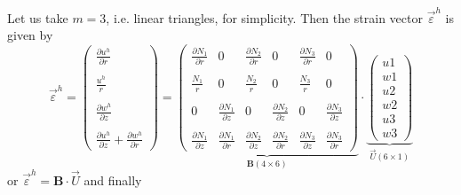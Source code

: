 \noindent Let us take $m=3$, i.e. linear triangles, for simplicity. Then 
the strain vector $\vec{\varepsilon}^h$ is given by
\[
\vec\varepsilon^h=
\left(
\begin{array}{c}
\frac{\partial u^h}{\partial r} \\ \\
\frac{u^h}{r} \\ \\
\frac{\partial w^h}{\partial z} \\ \\
\frac{\partial u^h}{\partial z} + \frac{\partial w^h}{\partial r} 
\end{array}
\right)
=
\underbrace{
\left(
\begin{array}{ccccccccc}
\frac{\partial N_1}{\partial r} &  0 &  
\frac{\partial N_2}{\partial r} &  0 &
\frac{\partial N_3}{\partial r} &  0 \\  \\
\frac{N_1}{r}  & 0 &  
\frac{N_2}{r}  & 0 &
\frac{N_3}{r}  & 0 \\  \\
 0 & \frac{\partial N_1}{\partial z}  &
 0 & \frac{\partial N_2}{\partial z}  &
 0 & \frac{\partial N_3}{\partial z}  \\ \\
\frac{\partial N_1}{\partial z} & \frac{\partial N_1}{\partial r}  &
\frac{\partial N_2}{\partial z} & \frac{\partial N_2}{\partial r}  &
\frac{\partial N_3}{\partial z} & \frac{\partial N_3}{\partial r}   
\end{array}
\right)
}_{\bm B (4\times 6) }
\cdot
\underbrace{
\left(
\begin{array}{c}
u1 \\  w1 \\ u2 \\  w2 \\ u3 \\ w3 
\end{array}
\right)
}_{\vec U (6\times1)}
\]
or $\vec\varepsilon^h= {\bm B} \cdot \vec{U}$
and finally 
